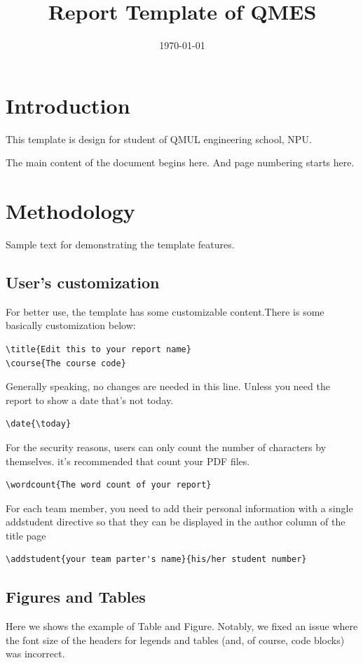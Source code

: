 \documentclass{qmes-template}
\title{Report Template of QMES}
\date{\today}
\begin{document}
\maketitle
\tableofcontents

\section{Introduction}
This template is design for student of QMUL engineering school, NPU.

The main content of the document begins here. And page numbering starts here.

\section{Methodology}
Sample text for demonstrating the template features.

\subsection{User's customization}
For better use, the template has some customizable content.There is some
basically customization below:
\begin{lstlisting}
\title{Edit this to your report name}
\course{The course code}
\end{lstlisting}

Generally speaking, no changes are needed in this line. Unless you need the
report to show a date that's not today.
\begin{lstlisting}
\date{\today}
\end{lstlisting}

For the security reasons, users can only count the number of characters by
themselves. it's recommended that count your PDF files.
\begin{lstlisting}
\wordcount{The word count of your report}
\end{lstlisting}

For each team member, you need to add their personal information with a single
addstudent directive so that they can be displayed in the author column of the
title page
\begin{lstlisting}
\addstudent{your team parter's name}{his/her student number}
\end{lstlisting}

\newpage{}
\subsection{Figures and Tables}
Here we shows the example of Table and Figure. Notably, we fixed an issue where
the font size of the headers for legends and tables (and, of course, code
blocks) was incorrect.
\end{document}
